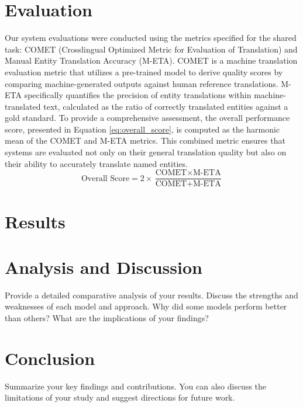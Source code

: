 \documentclass{ecai}
\begin{document}
\section{Evaluation}
\label{sec:experiments}
Our system evaluations were conducted using the metrics specified for the shared task: COMET 
(Crosslingual Optimized Metric for Evaluation of Translation)\cite{rei-etal-2020-comet} and 
Manual Entity Translation Accuracy (M-ETA). 
COMET is a machine translation evaluation metric that utilizes a pre-trained model to derive 
quality scores by comparing machine-generated outputs against human reference translations. 
M-ETA specifically quantifies the precision of entity translations within machine-translated text, 
calculated as the ratio of correctly translated entities against a gold standard.
To provide a comprehensive assessment, the overall performance score, presented in Equation \ref{eq:overall_score}, 
is computed as the harmonic mean of the COMET and M-ETA metrics. This combined metric ensures that systems are 
evaluated not only on their general translation quality but also on their ability to accurately translate named entities.
\begin{equation}
\label{eq:overall_score}
\text{Overall Score} = 2 \times \frac{\text{COMET} \times \text{M-ETA}}{\text{COMET} + \text{M-ETA}}
\end{equation}

\section{Results}
\label{eq:results}

\section{Analysis and Discussion}
\label{sec:analysis}
Provide a detailed comparative analysis of your results. Discuss the strengths and weaknesses of each model and approach. Why did some models perform better than others? What are the implications of your findings?

\section{Conclusion}
\label{sec:conclusion}
Summarize your key findings and contributions. You can also discuss the limitations of your study and suggest directions for future work.


\end{document}
